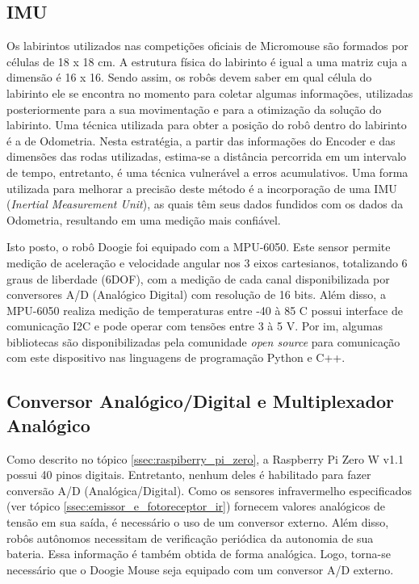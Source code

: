 \subsection{IMU}
\label{ssec:imu}
Os labirintos utilizados nas competições oficiais de Micromouse são formados por células de 18 x 18 cm. A estrutura física do labirinto é igual a uma matriz cuja a dimensão é 16 x 16. Sendo assim, os robôs devem saber em qual célula do labirinto ele se encontra no momento para coletar algumas informações, utilizadas posteriormente para a sua movimentação e para a otimização da solução do labirinto. Uma técnica utilizada para obter a posição do robô dentro do labirinto é a de Odometria. Nesta estratégia, a partir das informações do Encoder e das dimensões das rodas utilizadas, estima-se a distância percorrida em um intervalo de tempo, entretanto, é uma técnica vulnerável a erros acumulativos. Uma forma utilizada para melhorar a precisão deste método é a incorporação de uma IMU (\textit{Inertial Measurement Unit}), as quais têm seus dados fundidos com os dados da Odometria, resultando em uma medição mais confiável.

Isto posto, o robô Doogie foi equipado com a MPU-6050. Este sensor permite medição de aceleração e velocidade angular nos 3 eixos cartesianos, totalizando 6 graus de liberdade (6DOF), com a medição de cada canal disponibilizada por conversores A/D (Analógico Digital) com resolução de 16 bits. Além disso, a MPU-6050 realiza medição de temperaturas entre -40 à 85 \textdegree C possui interface de comunicação I2C e pode operar com tensões entre 3 à 5 V. Por im, algumas bibliotecas são disponibilizadas pela comunidade \textit{open source} para comunicação com este dispositivo nas linguagens de programação Python e C++.

\subsection{Conversor Analógico/Digital e Multiplexador Analógico}
\label{conversor_multiplexador_analogico}
Como descrito no tópico \ref{ssec:raspiberry_pi_zero}, a Raspberry Pi Zero W v1.1 possui 40 pinos digitais. Entretanto, nenhum deles é habilitado para fazer conversão A/D (Analógica/Digital). Como os sensores infravermelho especificados (ver tópico \ref{ssec:emissor_e_fotoreceptor_ir}) fornecem valores analógicos de tensão em sua saída, é necessário o uso de um conversor externo. Além disso, robôs autônomos necessitam de verificação periódica da autonomia de sua bateria. Essa informação é também obtida de forma analógica. Logo, torna-se necessário que o Doogie Mouse seja equipado com um conversor A/D externo.

